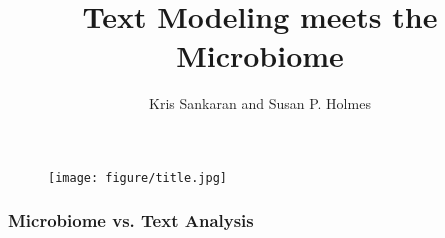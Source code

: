 \documentclass{beamer}
\title{Text Modeling meets the Microbiome}
\author{Kris Sankaran and Susan P. Holmes}
\institute{Department of Statistics, Stanford University}
\begin{document}
\begin{frame}
  \maketitle
\begin{figure}[ht]
  \centering
  \texttt{[image: figure/title.jpg]}
  \caption{\label{fig:label} }
\end{figure}

\end{frame}

\begin{frame}
  \frametitle{Microbiome vs. Text Analysis}
  \begingroup
  \fontsize{10pt}{5pt}\selectfont
  {\ttfamily
  \def\arraystretch{1.2}
  \setlength{\tabcolsep}{0.2em} %
  \begin{table}
     
    \\[12pt]
     
  \end{table}
  }
  \endgroup
\end{frame}
\end{document}
